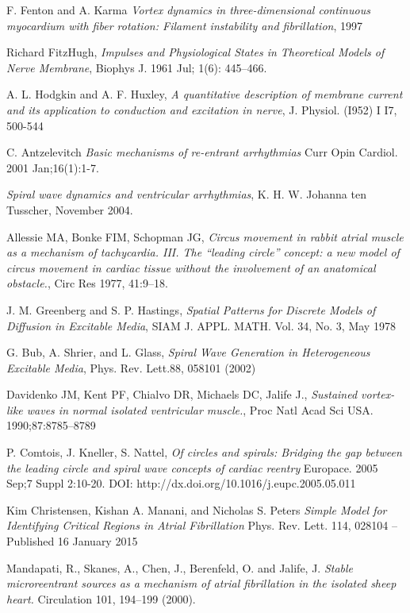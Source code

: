 \documentclass[twocolumn]{article}
\begin{document}
\begin{thebibliography}{7}
F. Fenton and A. Karma
\emph{Vortex dynamics in three-dimensional continuous myocardium with fiber
rotation: Filament instability and fibrillation},
1997

Richard FitzHugh, 
\emph{Impulses and Physiological States in Theoretical Models of Nerve Membrane},
Biophys J. 1961 Jul; 1(6): 445–466.


A. L. Hodgkin and A. F. Huxley, 
\emph{A quantitative description of membrane current and its application to conduction and excitation in nerve},
J. Physiol. (I952) I I7, 500-544

 C. Antzelevitch
\emph{Basic mechanisms of re-entrant arrhythmias}
Curr Opin Cardiol. 2001 Jan;16(1):1-7.


\emph{Spiral wave dynamics and ventricular arrhythmias},
 K. H. W. Johanna ten Tusscher,
 November 2004.

Allessie MA, Bonke FIM, Schopman JG,
\emph{ Circus movement in rabbit atrial muscle as a mechanism of tachycardia. III. The “leading circle” concept: a new model of circus movement in cardiac tissue without the involvement of an anatomical obstacle.},
 Circ Res 1977, 41:9–18.

J. M. Greenberg and S. P. Hastings, 
\emph{Spatial Patterns for Discrete Models of Diffusion in Excitable Media}, 
SIAM J. APPL. MATH.
Vol. 34, No. 3, May 1978

G. Bub, A. Shrier, and L. Glass,
\emph{Spiral Wave Generation in Heterogeneous Excitable Media},
 Phys. Rev. Lett.88, 058101 (2002)

Davidenko JM, Kent PF, Chialvo DR, Michaels DC, Jalife J., 
\emph{Sustained vortex-like waves in normal isolated ventricular muscle.},
 Proc Natl Acad Sci USA. 1990;87:8785–8789

P. Comtois, J. Kneller, S. Nattel,
\emph{Of circles and spirals: Bridging the gap between the leading circle and spiral wave concepts of cardiac reentry}
Europace. 2005 Sep;7 Suppl 2:10-20.
DOI: http://dx.doi.org/10.1016/j.eupc.2005.05.011

Kim Christensen, Kishan A. Manani, and Nicholas S. Peters
\emph{Simple Model for Identifying Critical Regions in Atrial Fibrillation}
Phys. Rev. Lett. 114, 028104 – Published 16 January 2015

Mandapati, R., Skanes, A., Chen, J., Berenfeld, O. and  Jalife, J. 
\emph{Stable microreentrant sources as a mechanism of atrial fibrillation in the isolated sheep heart.}
Circulation 101, 194–199 (2000). 


\end{thebibliography}
\end{document}
